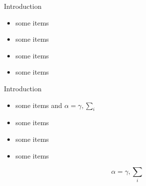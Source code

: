 \documentclass{beamer}
\begin{document}
\begin{frame}{}
\begin{columns}[t]
\begin{column}{.48\linewidth}
        \begin{block}{Introduction}
          \begin{itemize}
          \item some items
          \item some items
          \item some items
          \item some items
          \end{itemize}
        \end{block}

        \begin{block}{Introduction}
          \begin{itemize}
          \item some items and $\alpha=\gamma, \sum_{i}$
          \item some items
          \item some items
          \item some items
          \end{itemize}
          $$\alpha=\gamma, \sum_{i}$$
        \end{block}
      \end{column}
    \end{columns}
  \end{frame}
\end{document}
